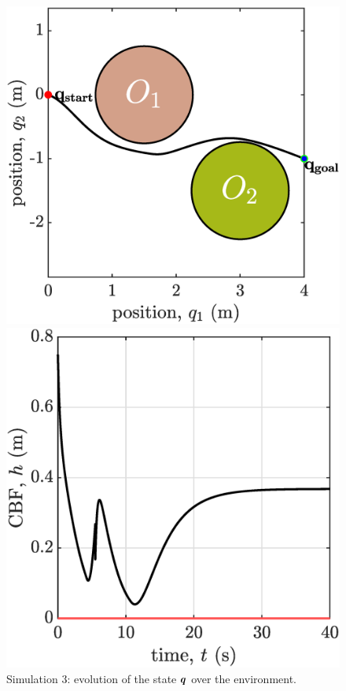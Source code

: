 \clearpage
\newpage
\begin{figure}[!ht]
    \begin{minipage}[b]{0.46\linewidth}
    \includegraphics[width=\textwidth]{figures/sim3map.eps}
    \caption{\label{fig:sim3map}Simulation 3: evolution of the state ${\boldsymbol{q}}$ over the environment.}
    \end{minipage}
    \hfill
    \begin{minipage}[b]{0.46\linewidth}
    \includegraphics[width=\textwidth]{figures/sim3h.eps}

\end{minipage}
\end{figure}
